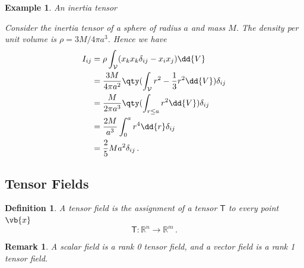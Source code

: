 \documentclass{article}
\theoremstyle{plain}\theoremheaderfont{\normalfont\itshape}\theorembodyfont{\rmfamily}\theoremseparator{.}\newtheorem*{rem}{Remark}\newtheorem*{ex}{Example}\newtheorem*{proof}{Proof}\newtheorem*{altp}{Alternative proof}
\theoremstyle{plain}\theoremheaderfont{\normalfont\bfseries}\theorembodyfont{\rmfamily}\theoremseparator{.}\newtheorem{thm}{Theorem}[section]\newtheorem{lem}[thm]{Lemma}\newtheorem{prop}[thm]{Proposition}\newtheorem*{cor}{Corollary}\newtheorem{defn}[thm]{Definition}\newtheorem{clm}[thm]{Claim}\newtheorem{clminproof}{Claim}
\theoremstyle{break}\theoremheaderfont{\normalfont\itshape}\theorembodyfont{\rmfamily}\theoremseparator{.\medskip}\newtheorem*{proofskip}{Proof}\newtheorem*{exs}{Examples}\newtheorem*{rems}{Remarks}
\theoremstyle{break}\theoremheaderfont{\normalfont\bfseries}\theorembodyfont{\rmfamily}\theoremseparator{.\medskip}\newtheorem{lemskip}[thm]{Lemma}\newtheorem{defnskip}[thm]{Definition}\newtheorem{propskip}[thm]{Proposition}\newtheorem{thmskip}[thm]{Theorem}
\numberwithin{equation}{section}
\begin{document}
	\begin{ex}
		\textit{An inertia tensor}

		Consider the inertia tensor of a sphere of radius \(a\) and mass \(M\). The density per unit volume is \(\rho=3M/4\pi a^3\). Hence we have
		\begin{align*}
			I_{ij}&=\rho\int_\mathcal{V}(x_kx_k\delta_{ij}-x_ix_j)\dd{V}\\
			&=\frac{3M}{4\pi a^2}\qty(\int_\mathcal{V}r^2-\frac{1}{3}r^2\dd{V})\delta_{ij}\\
			&=\frac{M}{2\pi a^3}\qty(\int_{r\le a}r^2 \dd{V})\delta_{ij}\\
			&=\frac{2M}{a^3}\int_0^a r^4\dd{r}\delta_{ij}\\
			&=\frac{2}{5}Ma^2\delta_{ij}\,.
		\end{align*}
	\end{ex}
	\subsection{Tensor Fields}
	\begin{defn}
		A \textit{tensor field} is the assignment of a tensor \(\mathsf{T}\) to every point \(\vb{x}\)
		\[\mathsf{T}:\mathbb{R}^n\to\mathbb{R}^m\,.\]
	\end{defn}
	\begin{rem}
		A \textit{scalar field} is a rank 0 tensor field, and a \textit{vector field} is a rank 1 tensor field.
	\end{rem}
\end{document}
